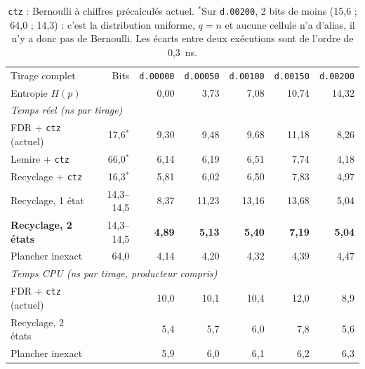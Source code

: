\documentclass[11pt,a4paper]{article}
\newcommand{\code}[1]{\texttt{#1}}
\begin{document}
\begin{table}[H]
\centering
\small
\setlength{\tabcolsep}{4pt}
\begin{tabular}{lrrrrrr}
\toprule
Tirage complet & Bits & \code{d.00000} & \code{d.00050} & \code{d.00100} & \code{d.00150} & \code{d.00200} \\
Entropie $H(p)$ & & 0,00 & 3,73 & 7,08 & 10,74 & 14,32 \\
\midrule
\multicolumn{7}{l}{\emph{Temps réel (ns par tirage)}} \\
FDR + \code{ctz} (actuel)  & 17,6$^*$ & 9,30 & 9,48 & 9,68 & 11,18 & 8,26 \\
Lemire + \code{ctz}        & 66,0$^*$ & 6,14 & 6,19 & 6,51 & 7,74 & 4,18 \\
Recyclage + \code{ctz}     & 16,3$^*$ & 5,81 & 6,02 & 6,50 & 7,83 & 4,97 \\
Recyclage, 1 état          & 14,3--14,5 & 8,37 & 11,23 & 13,16 & 13,68 & 5,04 \\
\textbf{Recyclage, 2 états} & 14,3--14,5 & \textbf{4,89} & \textbf{5,13} & \textbf{5,40} & \textbf{7,19} & \textbf{5,04} \\
Plancher inexact           & 64,0 & 4,14 & 4,20 & 4,32 & 4,39 & 4,47 \\
\midrule
\multicolumn{7}{l}{\emph{Temps CPU (ns par tirage, producteur compris)}} \\
FDR + \code{ctz} (actuel)  & & 10,0 & 10,1 & 10,4 & 12,0 & 8,9 \\
Recyclage, 2 états         & & 5,4 & 5,7 & 6,0 & 7,8 & 5,6 \\
Plancher inexact           & & 5,9 & 6,0 & 6,1 & 6,2 & 6,3 \\
\bottomrule
\end{tabular}
\caption{\code{ctz} : Bernoulli à chiffres précalculés actuel. $^*$Sur \code{d.00200}, 2 bits de moins
(15,6 ; 64,0 ; 14,3) : c'est la distribution uniforme, $q = n$ et aucune cellule n'a
d'alias, il n'y a donc pas de Bernoulli. Les écarts entre deux exécutions sont de
l'ordre de 0,3~ns.}
\label{tab:variantes}
\end{table}
\end{document}
